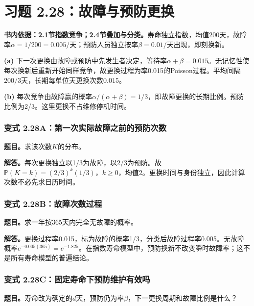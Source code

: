\documentclass[12pt,a4paper,UTF8,fontset=fandol]{ctexart}
\begin{document}
\section{习题
2.28：故障与预防更换}\label{ux4e60ux9898-2.28ux6545ux969cux4e0eux9884ux9632ux66f4ux6362}

\textbf{书内依据：2.1节指数竞争；2.4节叠加与分类。}寿命独立指数，均值200天，故障率\(\alpha=1/200=0.005\)/天；预防人员独立按率\(\beta=0.01\)/天出现，即刻换新。

\textbf{(a)}
下一次更换由故障或预防中先发生者决定，等待率\(\alpha+\beta=0.015\)。无记忆性使每次换新后重新开始同样竞争，故更换过程为率0.015的Poisson过程。平均间隔\(\boxed{200/3\text{天}}\)，长期每单位天更换次数\(\boxed{0.015}\)。

\textbf{(b)}
每次竞争由故障赢的概率\(\alpha/(\alpha+\beta)=\boxed{1/3}\)，即故障更换的长期比例。预防比例为2/3。这里更换不占维修停机时间。

\subsubsection{变式
2.28A：第一次实际故障之前的预防次数}\label{ux53d8ux5f0f-2.28aux7b2cux4e00ux6b21ux5b9eux9645ux6545ux969cux4e4bux524dux7684ux9884ux9632ux6b21ux6570}

\textbf{题目。}求该次数\(K\)的分布。

\textbf{解答。}每次更换独立以1/3为故障，以2/3为预防。故\(\mathbb P(K=k)=(2/3)^k(1/3)\)，\(k\ge0\)，均值2。更换时间与身份独立，因此计算次数不必先求日历时间。

\subsubsection{变式
2.28B：故障次数过程}\label{ux53d8ux5f0f-2.28bux6545ux969cux6b21ux6570ux8fc7ux7a0b}

\textbf{题目。}求一年按365天内完全无故障的概率。

\textbf{解答。}更换过程率0.015，标为故障的概率1/3，分类后故障过程率0.005。无故障概率\(e^{-0.005(365)}=e^{-1.825}\)。在指数寿命模型中，预防换新不改变瞬时故障率；这不是所有寿命模型的普遍结论。

\subsubsection{变式
2.28C：固定寿命下预防维护有效吗}\label{ux53d8ux5f0f-2.28cux56faux5b9aux5bffux547dux4e0bux9884ux9632ux7ef4ux62a4ux6709ux6548ux5417}

\textbf{题目。}寿命改为确定的\(d\)天，预防仍为率\(\beta\)，下一更换周期和故障比例是什么？
\end{document}
